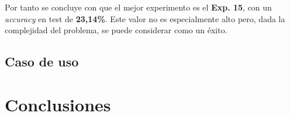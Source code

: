 \documentclass[12pt,a4paper, xcolor=table]{article}
\begin{document}
Por tanto se concluye con que el mejor experimento es el \textbf{Exp. 15}, con un \textit{accuracy} en test de \textbf{23,14\%}. Este valor no es especialmente alto pero, dada la complejidad del problema, se puede considerar como un éxito.





\subsection{Caso de uso}







\section{Conclusiones}

\clearpage



\end{document}

